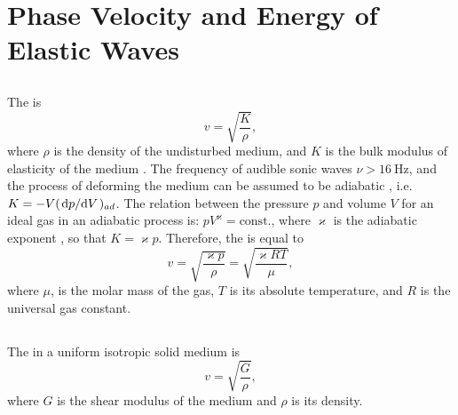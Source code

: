 \section{Phase Velocity and Energy of Elastic Waves}
\label{sec-30.3} 


\subsection{}\label{30.3.1} The  is
\begin{equation*}%
v = \sqrt{\frac{K}{\rho}},
\end{equation*}
where $\rho$ is the density of the undisturbed medium, and $K$ is the bulk modulus of elasticity of the medium . The frequency of audible sonic waves $\nu > \SI{16}{\hertz}$, and the process of deforming the medium can be assumed to be adiabatic , i.e. $K = -V (\dv*{p}{V})_{ad}$. The relation between the pressure $p$ and volume $V$ for an ideal gas  in an adiabatic process is: $pV^{\varkappa} = \text{const.}$, where $\varkappa$ is the adiabatic exponent , so that $K = \varkappa p$. Therefore, the  is equal to
\begin{equation*}%
v = \sqrt{\frac{\varkappa p}{\rho}} = \sqrt{\frac{\varkappa RT}{\mu}},
\end{equation*}
where $\mu$, is the molar mass of the gas, $T$ is its absolute temperature, and $R$ is the universal gas constant.

\subsection{}\label{30.3.2} The  in a uniform isotropic solid medium is
\begin{equation*}%
v = \sqrt{\frac{G}{\rho}},
\end{equation*}
where $G$ is the shear modulus of the medium  and $\rho$ is its density.

